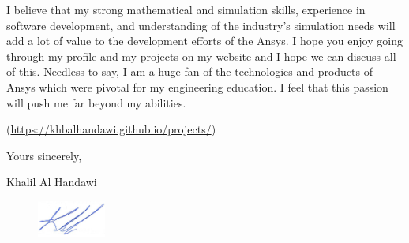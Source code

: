 \documentclass[12pt]{article} %
\begin{document}
\medskip %

I believe that my strong mathematical and simulation skills, experience in software development, and understanding of the industry's simulation needs will add a lot of value to the development efforts of the Ansys. I hope you enjoy going through my profile and my projects on my website and I hope we can discuss all of this. Needless to say, I am a huge fan of the technologies and products of Ansys which were pivotal for my engineering education. I feel that this passion will push me far beyond my abilities.

(\href{https://khbalhandawi.github.io/projects/}{https://khbalhandawi.github.io/projects/})


\medskip %

Yours sincerely,

\medskip %

Khalil Al Handawi

\begin{figure}[h]
	\includegraphics[width=0.2\textwidth]{Signiture.png}
\end{figure}

\medskip %

\end{document}
